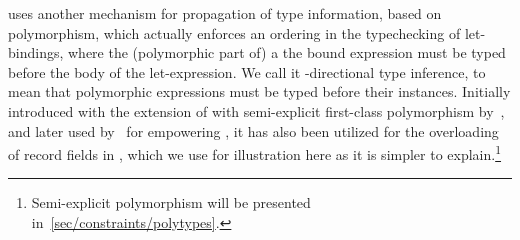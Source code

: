 \documentclass[acmsmall,screen,nonacm]{acmart}
\begin{document}
\OCaml uses another mechanism for propagation of type information,
based on polymorphism, which actually enforces an ordering in the
typechecking of let-bindings, where the (polymorphic part of) a the bound
expression must be typed before the body of the let-expression.  We call it
\textbf{\geninst}-directional type inference, to mean that polymorphic
expressions must be typed before their instances.  Initially introduced with
the extension of \ML with semi-explicit first-class polymorphism by~\citet
{Garrigue-Remy/poly-ml}, and later used by~\citet
{LeBotlan-Remy/recasting-mlf} for empowering \MLF, it has also been utilized
for the overloading of record fields in \OCaml, which we use for
illustration here as it is simpler to explain.\footnote {Semi-explicit
polymorphism will be presented in~\cref{sec/constraints/polytypes}.}
\end{document}
